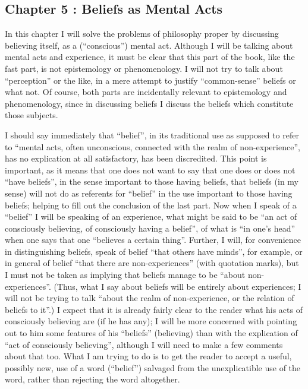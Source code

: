 \subsection*{Chapter 5 : Beliefs as Mental Acts}

In this chapter I will solve the problems of philosophy proper by 
discussing believing itself, as a (\enquote{conscious}) mental act. Although I will be 
talking about mental acts and experience, it must be clear that this part of 
the book, like the fast part, is not epistemology or phenomenology. I will 
not try to talk about \enquote{perception} or the like, in a mere attempt to justify 
\enquote{common-sense} beliefs or what not. Of course, both parts are incidentally 
relevant to epistemology and phenomenology, since in discussing beliefs I 
discuss the beliefs which constitute those subjects. 

I should say immediately that \enquote{belief}, in its traditional use as supposed 
to refer to \enquote{mental acts, often unconscious, connected with the realm of 
non-experience}, has no explication at all satisfactory, has been discredited. 
This point is important, as it means that one does not want to say that one 
does or does not \enquote{have beliefs}, in the sense important to those having 
beliefs, that beliefs (in my sense) will not do as referents for \enquote{belief} in the 
use important to those having beliefs; helping to fill out the conclusion of 
the last part. Now when I speak of a \enquote{belief} I will be speaking of an 
experience, what might be said to be \enquote{an act of consciously believing, of 
consciously having a belief}, of what is \enquote{in one's head} when one says that 
one \enquote{believes a certain thing}. Further, I will, for convenience in 
distinguishing beliefs, speak of belief \enquote{that others have minds}, for example, 
or in general of belief \enquote{that there are non-experiences} (with quotation 
marks), but I must not be taken as implying that beliefs manage to be 
\enquote{about non-experiences}. (Thus, what I say about beliefs will be entirely 
about experiences; I will not be trying to talk \enquote{about the realm of 
non-experience, or the relation of beliefs to it}.) I expect that it is already 
fairly clear to the reader what his acts of consciously believing are (if he has 
any); I will be more concerned with pointing out to him some features of his 
\enquote{beliefs} (believing) than with the explication of \enquote{act of consciously 
believing}, although I will need to make a few comments about that too. 
What I am trying to do is to get the reader to accept a useful, possibly new, 
use of a word (\enquote{belief}) salvaged from the unexplicatible use of the word, 
rather than rejecting the word altogether. 


